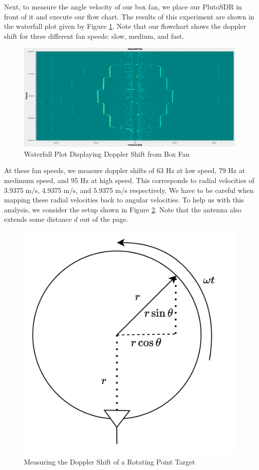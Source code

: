 \documentclass{article}
\begin{document}


Next, to measure the angle velocity of our box fan, we place our PlutoSDR in front of it and execute our flow chart. The results of this experiment are shown in the waterfall plot given by Figure \ref{fig::dopp_spectrum}. Note that our flowchart shows the doppler shift for three different fan speeds: slow, medium, and fast.

\begin{figure}[H]
    	\centering
    \includegraphics[width=0.9\linewidth]{dopp_spectrum2.png}
    	\caption{Waterfall Plot Displaying Doppler Shift from Box Fan}
    	\label{fig::dopp_spectrum}
\end{figure}

\noindent At these fan speeds, we measure doppler shifts of 63 Hz at low speed, 79 Hz at medimum speed, and 95 Hz at high speed. This corresponds to radial velocities of 3.9375 m/s, 4.9375 m/s, and 5.9375 m/s respectively. We have to be careful when mapping these radial velocities back to angular velocities. To help us with this analysis, we consider the setup shown in Figure \ref{fig::angular_velocity_measurement}. Note that the antenna also extends some distance $d$ out of the page.

\begin{figure}[H]
    	\centering
    \includegraphics[width=0.4\linewidth]{angular_velocity_measurement.png}
    	\caption{Measuring the Doppler Shift of a Rotating Point Target}
    	\label{fig::angular_velocity_measurement}
\end{figure}
\end{document}
